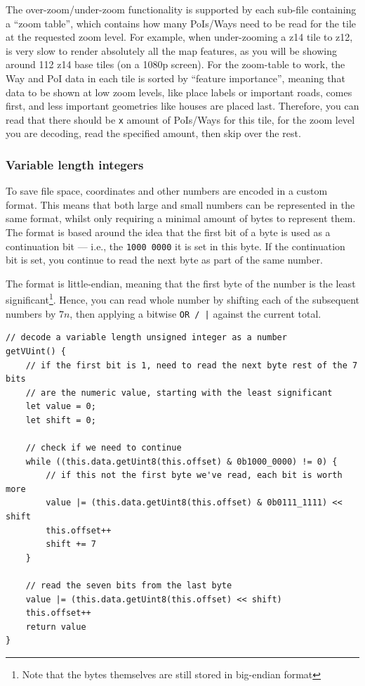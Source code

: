 \documentclass[]{final_report}
\begin{document}
The over-zoom/under-zoom functionality is supported by each sub-file containing a ``zoom table'', which contains how many PoIs/Ways need to be read for the tile at the requested zoom level. For example, when under-zooming a z14 tile to z12, is very slow to render absolutely all the map features, as you will be showing around 112 z14 base tiles (on a 1080p screen). For the zoom-table to work, the Way and PoI data in each tile is sorted by ``feature importance'', meaning that data to be shown at low zoom levels, like place labels or important roads, comes first, and less important geometries like houses are placed last. Therefore, you can read that there should be \texttt{x} amount of PoIs/Ways for this tile, for the zoom level you are decoding, read the specified amount, then skip over the rest.

\subsubsection{Variable length integers}

To save file space, coordinates and other numbers are encoded in a custom format. This means that both large and small numbers can be represented in the same format, whilst only requiring a minimal amount of bytes to represent them. The format is based around the idea that the first bit of a byte is used as a continuation bit --- i.e., the \texttt{1000 0000} it is set in this byte. If the continuation bit is set, you continue to read the next byte as part of the same number.

The format is little-endian, meaning that the first byte of the number is the least significant\footnote{Note that the bytes themselves are still stored in big-endian format}. Hence, you can read whole number by shifting each of the subsequent numbers by \(7n\), then applying a bitwise \texttt{OR / |} against the current total.

\begin{lstlisting}
// decode a variable length unsigned integer as a number
getVUint() {
    // if the first bit is 1, need to read the next byte rest of the 7 bits
    // are the numeric value, starting with the least significant
    let value = 0;
    let shift = 0;

    // check if we need to continue
    while ((this.data.getUint8(this.offset) & 0b1000_0000) != 0) {
        // if this not the first byte we've read, each bit is worth more
        value |= (this.data.getUint8(this.offset) & 0b0111_1111) << shift
        this.offset++
        shift += 7
    }

    // read the seven bits from the last byte
    value |= (this.data.getUint8(this.offset) << shift)
    this.offset++
    return value
}
\end{lstlisting}
\end{document}
